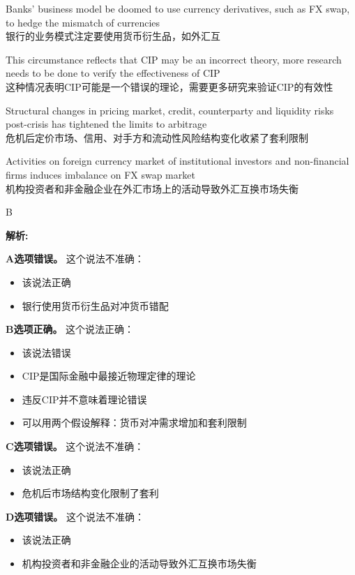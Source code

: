 \documentclass{article}
\newenvironment{explanation}
{\textbf{解析:}\par}
{\par}
\begin{document}
\begin{choices}
    \item Banks' business model be doomed to use currency derivatives, such as FX swap, to hedge the mismatch of currencies\\
    银行的业务模式注定要使用货币衍生品，如外汇互
    \item This circumstance reflects that CIP may be an incorrect theory, more research needs to be done to verify the effectiveness of CIP\\
    这种情况表明CIP可能是一个错误的理论，需要更多研究来验证CIP的有效性
    \item Structural changes in pricing market, credit, counterparty and liquidity risks post-crisis has tightened the limits to arbitrage\\
    危机后定价市场、信用、对手方和流动性风险结构变化收紧了套利限制
    \item Activities on foreign currency market of institutional investors and non-financial firms induces imbalance on FX swap market\\
    机构投资者和非金融企业在外汇市场上的活动导致外汇互换市场失衡
\end{choices}

\begin{correctanswer}
    B
\end{correctanswer}

\begin{explanation}
    \textbf{A选项错误。}
    这个说法不准确：
    \begin{itemize}
        \item 该说法正确
        \item 银行使用货币衍生品对冲货币错配
    \end{itemize}

    \textbf{B选项正确。}
    这个说法正确：
    \begin{itemize}
        \item 该说法错误
        \item CIP是国际金融中最接近物理定律的理论
        \item 违反CIP并不意味着理论错误
        \item 可以用两个假设解释：货币对冲需求增加和套利限制
    \end{itemize}

    \textbf{C选项错误。}
    这个说法不准确：
    \begin{itemize}
        \item 该说法正确
        \item 危机后市场结构变化限制了套利
    \end{itemize}

    \textbf{D选项错误。}
    这个说法不准确：
    \begin{itemize}
        \item 该说法正确
        \item 机构投资者和非金融企业的活动导致外汇互换市场失衡
    \end{itemize}
\end{explanation}
\end{document}
